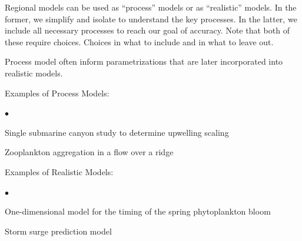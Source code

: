\documentclass[letterpaper,12pt]{article}
\newcounter{lnum}
\newenvironment{abbrevlist}%
  {\begin{list}{$\bullet$}{\setlength{\leftmargin}{2em}%
               \setlength{\itemindent}{0em}%
               \setlength{\itemsep}{0pt}%
               \setlength{\parsep}{0pt}%
               \setlength{\topsep}{2pt}%
               \usecounter{lnum} } }{\end{list}}
\begin{document}
Regional models can be used as ``process'' models or as ``realistic'' models.  In the former, we simplify and isolate to understand the key processes.  In the latter, we include all necessary processes to reach our goal of accuracy.  Note that both of these require choices.  Choices in what to include and in what to leave out.

Process model often inform parametrizations that are later incorporated into realistic models.

Examples of Process Models:
\begin{abbrevlist}
\item Single submarine canyon study to determine upwelling scaling
\item Zooplankton aggregation in a flow over a ridge
\end{abbrevlist}

Examples of Realistic Models:
\begin{abbrevlist}
\item One-dimensional model for the timing of the spring phytoplankton bloom
\item Storm surge prediction model
\end{abbrevlist}
\end{document}
